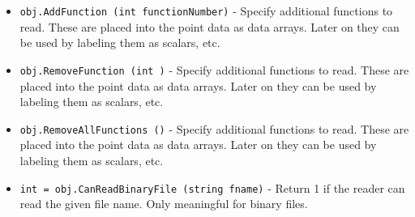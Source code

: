 \begin{itemize}
\item  \verb|obj.AddFunction (int functionNumber)| -  Specify additional functions to read. These are placed into the
 point data as data arrays. Later on they can be used by labeling
 them as scalars, etc.

\item  \verb|obj.RemoveFunction (int )| -  Specify additional functions to read. These are placed into the
 point data as data arrays. Later on they can be used by labeling
 them as scalars, etc.

\item  \verb|obj.RemoveAllFunctions ()| -  Specify additional functions to read. These are placed into the
 point data as data arrays. Later on they can be used by labeling
 them as scalars, etc.

\item  \verb|int = obj.CanReadBinaryFile (string fname)| -  Return 1 if the reader can read the given file name. Only meaningful
 for binary files.

\end{itemize}

